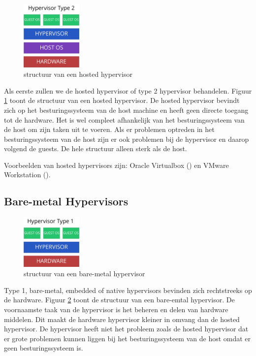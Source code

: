 \documentclass[pdftex,a4paper,12pt,twoside]{report}
\begin{document}
\begin{figure}
    \centering
    \includegraphics[width=3cm]{img/hypervisor-2}
    \caption{structuur van een hosted hypervisor}
    \label{fig:hypervisor-2}
\end{figure}

Als eerste zullen we de hosted hypervisor of type 2 hypervisor behandelen. Figuur \ref{fig:hypervisor-2} toont de structuur van een hosted hypervisor. De hosted hypervisor bevindt zich op het besturingssysteem van de host machine en heeft geen directe toegang tot de hardware. Het is wel compleet afhankelijk van het besturingssysteem van de host om zijn taken uit te voeren. Als er problemen optreden in het besturingssysteem van de host zijn er ook problemen bij de hypervisor en daarop volgend de guests. De hele structuur alleen sterk als de host.

Voorbeelden van hosted hypervisors zijn: Oracle Virtualbox (\cite{oracle_oracle_2016}) en VMware Workstation (\cite{vmware_vmware_2016-1}).

\subsection{Bare-metal Hypervisors}

\begin{figure}
    \centering
    \includegraphics[width=3cm]{img/hypervisor-1}
    \caption{structuur van een bare-metal hypervisor}
    \label{fig:hypervisor-1}
\end{figure}

Type 1, bare-metal, embedded of native hypervisors bevinden zich rechtstreeks op de hardware. Figuur \ref{fig:hypervisor-1} toont de structuur van een bare-emtal hypervisor. De voornaamste taak van de hypervisor is het beheren en delen van hardware middelen. Dit maakt de hardware hypervisor kleiner in omvang dan de hosted hypervisor. De hypervisor heeft niet het probleem zoals de hosted hypervisor dat er grote problemen kunnen liggen bij het besturingssysteem van de host omdat er geen besturingssysteem is.
\end{document}
